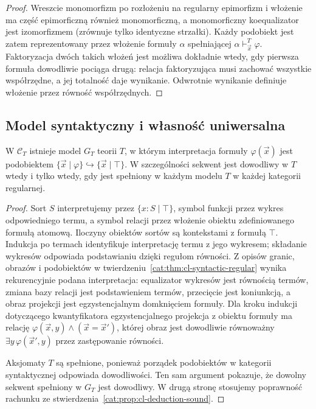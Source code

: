 \begin{proof}
Wreszcie monomorfizm po rozłożeniu na regularny epimorfizm i włożenie ma część epimorficzną również monomorficzną, a monomorficzny koequalizator jest izomorfizmem (zrównuje tylko identyczne strzałki). Każdy podobiekt jest zatem reprezentowany przez włożenie formuły $\alpha$ spełniającej $\alpha\vdash^T_{\vec x}\varphi$. Faktoryzacja dwóch takich włożeń jest możliwa dokładnie wtedy, gdy pierwsza formuła dowodliwie pociąga drugą: relacja faktoryzująca musi zachować wszystkie współrzędne, a jej totalność daje wynikanie. Odwrotnie wynikanie definiuje włożenie przez równość współrzędnych.
\end{proof}

\subsection{Model syntaktyczny i własność uniwersalna}

\begin{twierdzenie}\label{cat:thm:cl-generic-model}
W $\mathcal C_T$ istnieje model $G_T$ teorii $T$, w którym interpretacja formuły $\varphi(\vec x)$ jest podobiektem $\{\vec x\mid\varphi\}\hookrightarrow\{\vec x\mid\top\}$. W szczególności sekwent jest dowodliwy w $T$ wtedy i tylko wtedy, gdy jest spełniony w każdym modelu $T$ w każdej kategorii regularnej.
\end{twierdzenie}
\begin{proof}
Sort $S$ interpretujemy przez $\{x:S\mid\top\}$, symbol funkcji przez wykres odpowiedniego termu, a symbol relacji przez włożenie obiektu zdefiniowanego formułą atomową. Iloczyny obiektów sortów są kontekstami z formułą $\top$. Indukcja po termach identyfikuje interpretację termu z jego wykresem; składanie wykresów odpowiada podstawianiu dzięki regułom równości. Z opisów granic, obrazów i podobiektów w twierdzeniu~\ref{cat:thm:cl-syntactic-regular} wynika rekurencyjnie podana interpretacja: equalizator wykresów jest równością termów, zmiana bazy relacji jest podstawieniem termów, przecięcie jest koniunkcją, a obraz projekcji jest egzystencjalnym domknięciem formuły. Dla kroku indukcji dotyczącego kwantyfikatora egzystencjalnego projekcja z obiektu formuły ma relację $\varphi(\vec x,y)\wedge(\vec x=\vec x')$, której obraz jest dowodliwie równoważny $\exists y\,\varphi(\vec x',y)$ przez zastępowanie równości.

Aksjomaty $T$ są spełnione, ponieważ porządek podobiektów w kategorii syntaktycznej odpowiada dowodliwości. Ten sam argument pokazuje, że dowolny sekwent spełniony w $G_T$ jest dowodliwy. W drugą stronę stosujemy poprawność rachunku ze stwierdzenia~\ref{cat:prop:cl-deduction-sound}.
\end{proof}

